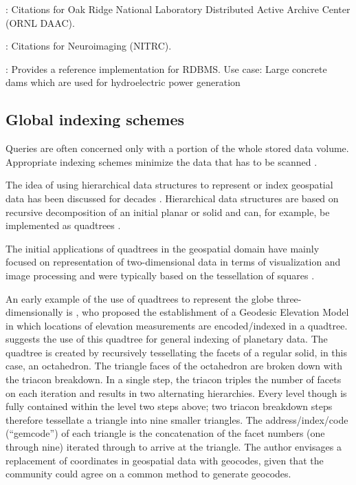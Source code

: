 \documentclass[a4paper,10pt]{article}
\begin{document}
\citep{Cook2016}: Citations for Oak Ridge National Laboratory Distributed Active Archive Center (ORNL DAAC).

\citep{Honor2016}: Citations for Neuroimaging (NITRC).

\citep{Proll2013}: Provides a reference implementation for \gls{RDBMS}. Use case: Large concrete dams which are used for hydroelectric power generation

\newpage
\subsection{Global indexing schemes}
\label{lit_index}
Queries are often concerned only with a portion of the whole stored data volume.
Appropriate indexing schemes minimize the data that has to be scanned \citep{Kunszt2000}.

The idea of using hierarchical data structures to represent or index geospatial data has been discussed for decades \citep{Dutton1996, Samet1988}.
Hierarchical data structures are based on recursive decomposition of an initial planar or solid and can, for example, be implemented as quadtrees \citep{Samet1988}.

The initial applications of quadtrees in the geospatial domain have mainly focused on representation of two-dimensional data in terms of visualization and image processing and were typically based on the tessellation of squares \citep{Lugo1995}.

An early example of the use of quadtrees to represent the globe three-dimensionally is \cite{Dutton1984}, who proposed the establishment of a Geodesic Elevation Model in which locations of elevation measurements are encoded/indexed in a quadtree. 
\cite{Dutton1989} suggests the use of this quadtree for general indexing of planetary data.
The quadtree is created by recursively tessellating the facets of a regular solid, in this case, an octahedron.
The triangle faces of the octahedron are broken down with the triacon breakdown. In a single step, the triacon triples the number of facets on each iteration and results in two alternating hierarchies. Every level though is fully contained within the level two steps above; two triacon breakdown steps therefore tessellate a triangle into nine smaller triangles. The address/index/code (``gemcode'') of each triangle is the concatenation of the facet numbers (one through nine) iterated through to arrive at the triangle. The author envisages a replacement of coordinates in geospatial data with geocodes, given that the community could agree on a common method to generate geocodes.
\end{document}
